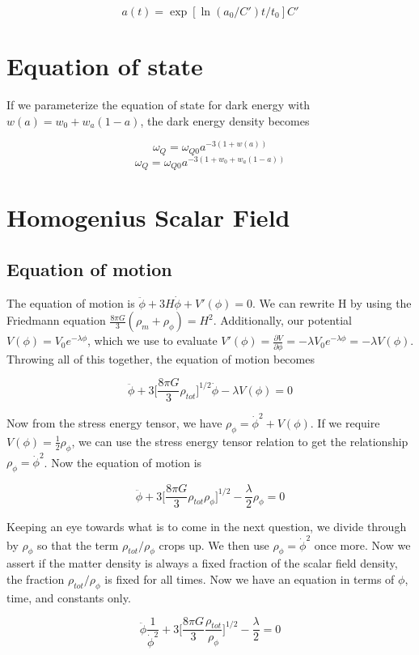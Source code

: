 \documentclass[12pt]{article}
\begin{document}
$$a(t) = \exp[\ln (a_0/C') t/ t_{0}]  C'$$

\section{Equation of state}
If we parameterize the equation of state for dark energy with $w(a) = w_0 + w_{a}(1 - a)$, the dark energy density becomes

$$ \omega_{Q} = \omega_{Q 0}a^{-3(1 + w(a))}$$
$$ \omega_{Q} = \omega_{Q 0}a^{-3(1 + w_0 + w_{a}(1 - a))}$$

\section{Homogenius Scalar Field}
\subsection{Equation of motion}
The equation of motion is $\ddot{\phi} + 3H\dot{\phi} + V'(\phi) = 0$. We can rewrite H by using the Friedmann equation $\frac{8 \pi G}{3} (\rho_m + \rho_{\phi}) = H^2$.  Additionally, our potential $V(\phi) = V_{0}e^{-\lambda \phi}$, which we use to evaluate $V'(\phi) = \frac{\partial V}{\partial \phi} = -\lambda V_{0}e^{-\lambda \phi} = -\lambda V(\phi)$. Throwing all of this together, the equation of motion becomes

$$\ddot{\phi} + 3\Big[ \frac{8 \pi G}{3} \rho_{tot} \Big]^{1/2}\dot{\phi} - \lambda V(\phi) = 0$$

Now from the stress energy tensor, we have $\rho_{\phi} = \dot{\phi}^2 + V(\phi)$. If we require $V(\phi) = \frac{1}{2} \rho_{\phi}$, we can use the stress energy tensor relation to get the relationship $\rho_{\phi} = \dot{\phi}^2$. Now the equation of motion is 

$$\ddot{\phi} + 3\Big[ \frac{8 \pi G}{3} \rho_{tot} \rho_{\phi} \Big]^{1/2} - \frac{\lambda}{2} \rho_{\phi} = 0$$

Keeping an eye towards what is to come in the next question, we divide through by $\rho_{\phi} $ so that the term $\rho_{tot}/ \rho_{\phi} $ crops up. We then use $\rho_{\phi} = \dot{\phi}^2$ once more. Now we assert if the matter density is always a fixed fraction of the scalar field density, the fraction $\rho_{tot}/ \rho_{\phi}$ is fixed for all times. Now we have an equation in terms of $\phi$, time, and constants only.

 $$\ddot{\phi} \frac{1}{\dot{\phi}^2} + 3\Big[ \frac{8 \pi G}{3} \frac{\rho_{tot}}{ \rho_{\phi}} \Big]^{1/2} - \frac{\lambda}{2} = 0$$
 
\end{document}
